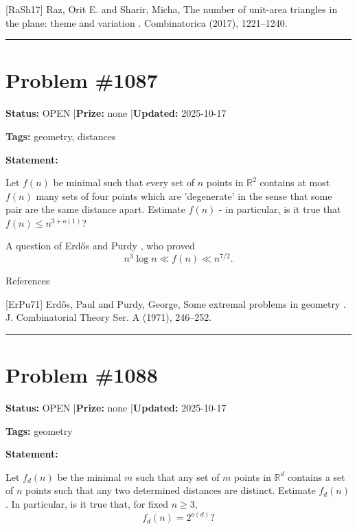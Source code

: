 \documentclass{article}
\begin{document}
[RaSh17] Raz, Orit E. and Sharir, Micha, The number of unit-area triangles in the plane: theme and variation . Combinatorica (2017), 1221--1240.

\noindent\rule{\linewidth}{0.4pt}


\section{Problem \#1087}
\label{prob:1087}

\noindent\textbf{Status:} OPEN \quad|\quad \textbf{Prize:} none \quad|\quad \textbf{Updated:} 2025-10-17

\noindent\textbf{Tags:} geometry, distances

\medskip

\noindent\textbf{Statement:}

Let $f(n)$ be minimal such that every set of $n$ points in $\mathbb{R}^2$ contains at most $f(n)$ many sets of four points which are 'degenerate' in the sense that some pair are the same distance apart. Estimate $f(n)$ - in particular, is it true that $f(n)\leq n^{3+o(1)}$?




A question of Erd\H{o}s and Purdy \cite{ErPu71}, who proved\[n^3\log n \ll f(n) \ll n^{7/2}.\]




References

[ErPu71] Erd\H{o}s, Paul and Purdy, George, Some extremal problems in geometry . J. Combinatorial Theory Ser. A (1971), 246--252.

\noindent\rule{\linewidth}{0.4pt}


\section{Problem \#1088}
\label{prob:1088}

\noindent\textbf{Status:} OPEN \quad|\quad \textbf{Prize:} none \quad|\quad \textbf{Updated:} 2025-10-17

\noindent\textbf{Tags:} geometry

\medskip

\noindent\textbf{Statement:}

Let $f_d(n)$ be the minimal $m$ such that any set of $m$ points in $\mathbb{R}^d$ contains a set of $n$ points such that any two determined distances are distinct. Estimate $f_d(n)$. In particular, is it true that, for fixed $n\geq 3$,\[f_d(n)=2^{o(d)}?\]
\end{document}
